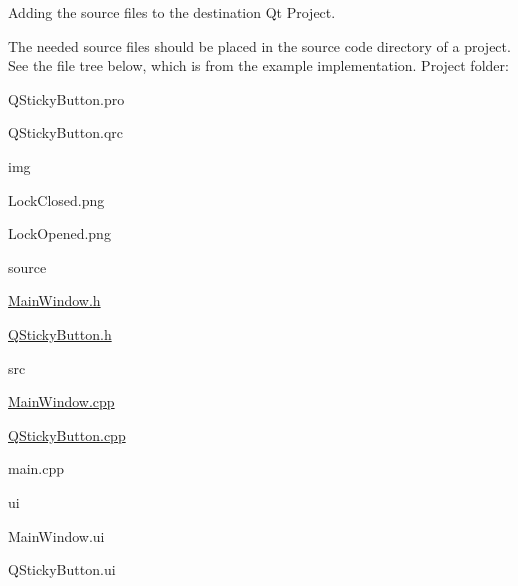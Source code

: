 \begin{DoxyEnumerate}
\item Adding the source files to the destination Qt Project.
\begin{DoxyItemize}
\item The needed source files should be placed in the source code directory of a project. See the file tree below, which is from the example implementation. Project folder\-:
\begin{DoxyItemize}
\item Q\-Sticky\-Button.\-pro
\item Q\-Sticky\-Button.\-qrc
\item img
\begin{DoxyItemize}
\item Lock\-Closed.\-png
\item Lock\-Opened.\-png
\end{DoxyItemize}
\item source
\begin{DoxyItemize}
\item \hyperlink{_main_window_8h}{Main\-Window.\-h}
\item \hyperlink{_q_sticky_button_8h}{Q\-Sticky\-Button.\-h}
\item src
\begin{DoxyItemize}
\item \hyperlink{_main_window_8cpp}{Main\-Window.\-cpp}
\item \hyperlink{_q_sticky_button_8cpp}{Q\-Sticky\-Button.\-cpp}
\item main.\-cpp
\end{DoxyItemize}
\end{DoxyItemize}
\item ui
\begin{DoxyItemize}
\item Main\-Window.\-ui
\item Q\-Sticky\-Button.\-ui
\end{DoxyItemize}
\end{DoxyItemize}


\end{DoxyItemize}
\end{DoxyEnumerate}
